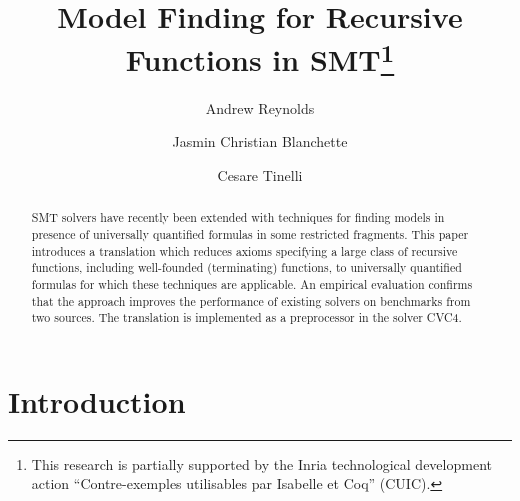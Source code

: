 


\title{Model Finding for Recursive Functions in SMT\thanks{%
This research is partially supported by the Inria technological development
action ``Contre-exemples utilisables par Isabelle et Coq'' (CUIC).
}
}

\author {Andrew Reynolds \and Jasmin Christian Blanchette \and Cesare Tinelli }

\maketitle

\setcounter{footnote}{0}

\begin{abstract}
\noindent
SMT solvers have recently been extended with techniques for finding models
in presence of universally quantified formulas in some restricted fragments.
This paper introduces a translation which reduces axioms specifying a large
class of recursive functions, including well-founded (terminating) functions,
to universally quantified formulas for which these
techniques are applicable.
An empirical evaluation confirms that the approach improves 
the performance of existing solvers on benchmarks from two sources. 
The translation is implemented as a preprocessor in the solver CVC4.
\end{abstract}

\section{Introduction}
\label{sec:introduction}


